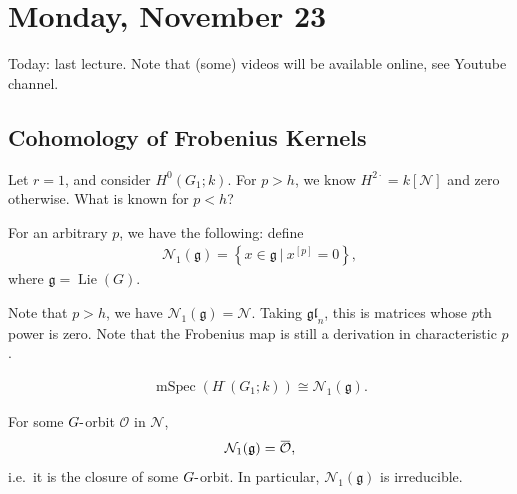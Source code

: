 \hypertarget{monday-november-23}{%
\section{Monday, November 23}\label{monday-november-23}}

Today: last lecture. Note that (some) videos will be available online,
see Youtube channel.

\hypertarget{cohomology-of-frobenius-kernels-1}{%
\subsection{Cohomology of Frobenius
Kernels}\label{cohomology-of-frobenius-kernels-1}}

Let \(r=1\), and consider \(H^0(G_1; k)\). For \(p > h\), we know
\(H^{2\cdot} = k[\mathcal{N}]\) and zero otherwise. What is known for
\(p<h\)?

\begin{definition}

For an arbitrary \(p\), we have the following: define
\begin{align*}  
\mathcal{N}_1({\mathfrak{g}}) = \left\{{x\in {\mathfrak{g}}{~\mathrel{\Big|}~}x^{[p]} = 0 }\right\}
,\end{align*}
where \({\mathfrak{g}}= \operatorname{Lie}(G)\).

\end{definition}

Note that \(p>h\), we have
\(\mathcal{N}_1({\mathfrak{g}}) = \mathcal{N}\). Taking
\({\mathfrak{gl}}_n\), this is matrices whose \(p\)th power is zero.
Note that the Frobenius map is still a derivation in characteristic
\(p\).

\begin{theorem}[Jantzen, 1986]

\begin{align*}  
\operatorname{mSpec}(H^\cdot(G_1; k) ) \cong \mathcal{N}_1({\mathfrak{g}})
.\end{align*}

\end{theorem}

\begin{theorem}

For some \(G{\hbox{-}}\)orbit \(\mathcal{O}\) in \(\mathcal{N}\),
\begin{align*}  
\mathcal{N}_1({\mathfrak{g}}) = \mkern 1.5mu\overline{\mkern-1.5mu\mathcal{O}\mkern-1.5mu}\mkern 1.5mu
,\end{align*}
i.e.~it is the closure of some \(G{\hbox{-}}\)orbit. In particular,
\(\mathcal{N}_1({\mathfrak{g}})\) is irreducible.

\end{theorem}

